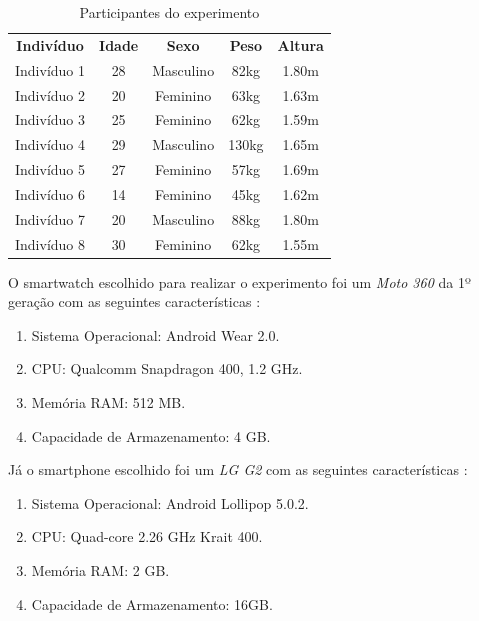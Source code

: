 \begin{table}
	\centering
	\caption{Participantes do experimento}
	\label{tab:experiment}
	\begin{tabular}{c|c|c|c|c}
		\hline
		\textbf{Indivíduo}  & \textbf{Idade} 	& \textbf{Sexo}   &    \textbf{Peso}    & \textbf{Altura} 	 \\
		Indivíduo 1         &    28          & Masculino            & 82kg      		& 1.80m          \\  
		Indivíduo 2         &    20          & Feminino             & 63kg      		& 1.63m          \\
		Indivíduo 3         &    25          & Feminino             & 62kg      		& 1.59m          \\ 
		Indivíduo 4         &    29          & Masculino            & 130kg      		& 1.65m          \\ 
		Indivíduo 5         &    27          & Feminino             & 57kg      		& 1.69m          \\ 
		Indivíduo 6         &    14          & Feminino             & 45kg      		& 1.62m          \\
		Indivíduo 7         &    20          & Masculino            & 88kg      		& 1.80m          \\ 
		Indivíduo 8         &    30          & Feminino             & 62kg      		& 1.55m          \\   
	\end{tabular}
\end{table}

 
O smartwatch escolhido para realizar o experimento foi um \textit{Moto 360} da 1º geração com as seguintes características \citep{moto360}:

	\begin{enumerate}
		\item Sistema Operacional: Android Wear 2.0.
		\item CPU: Qualcomm Snapdragon 400, 1.2 GHz.
		\item Memória RAM: 512 MB.
		\item Capacidade de Armazenamento: 4 GB.
	\end{enumerate}
	
Já o smartphone escolhido foi um \textit{LG G2} com as seguintes características \citep{lg_g2}:

	\begin{enumerate}
		\item Sistema Operacional: Android  Lollipop 5.0.2.
		\item CPU: Quad-core 2.26 GHz Krait 400.
		\item Memória RAM: 2 GB.
		\item Capacidade de Armazenamento: 16GB.
	\end{enumerate}


